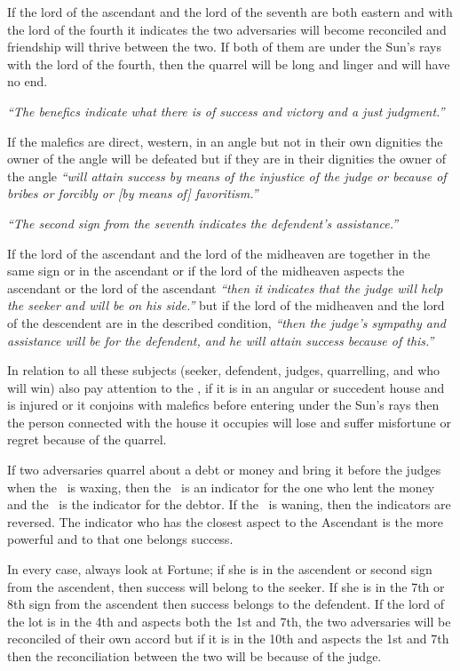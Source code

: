 If the lord of the ascendant and the lord of the seventh are both eastern and with the lord of the fourth it indicates the two adversaries will become reconciled and friendship will thrive between the two. If both of them are under the Sun's rays with the lord of the fourth, then the quarrel will be long and linger and will have no end.

\textsl{``The benefics indicate what there is of success and victory and a just judgment.''}

If the malefics are direct, western, in an angle but not in their own dignities the owner of the angle will be defeated but if they are in their dignities the owner of the angle \textsl{``will attain success by means of the injustice of the judge or because of bribes or forcibly or [by means of] favoritism.''}

\textsl{``The second sign from the seventh indicates the defendent's assistance.''}

If the lord of the ascendant and the lord of the midheaven are together in the same sign or in the ascendant or if the lord of the midheaven aspects the ascendant or the lord of the ascendant \textsl{``then it indicates that the judge will help the seeker and will be on his side.''} but if the lord of the midheaven and the lord of the descendent are in the described condition, \textsl{``then the judge's sympathy and assistance will be for the defendent, and he will attain success because of this.''}

In relation to all these subjects (seeker, defendent, judges, quarrelling, and who will win) also pay attention to the \Moon, if it is in an angular or succedent house and is  injured or it conjoins with malefics before entering under the Sun's rays then the person connected with the house it occupies will lose and suffer misfortune or regret because of the quarrel.

If two adversaries quarrel about a debt or money and bring it before the judges when the \Moon\, is waxing, then the \Moon\, is an indicator for the one who lent the money and the \Sun\, is the indicator for the debtor. If the \Moon\, is waning, then the indicators are reversed.  The indicator who has the closest aspect to the Ascendant is the more powerful and to that one belongs success.

In every case, always look at Fortune; if she is in the ascendent or second sign from the ascendent, then success will belong to the seeker. If she is in the 7th or 8th sign from the ascendent then success belongs to the defendent. If the lord of the lot is in the 4th and aspects both the 1st and 7th, the two adversaries will be reconciled of their own accord but if it is in the 10th and aspects the 1st and 7th then the reconciliation between the two will be because of the judge.

